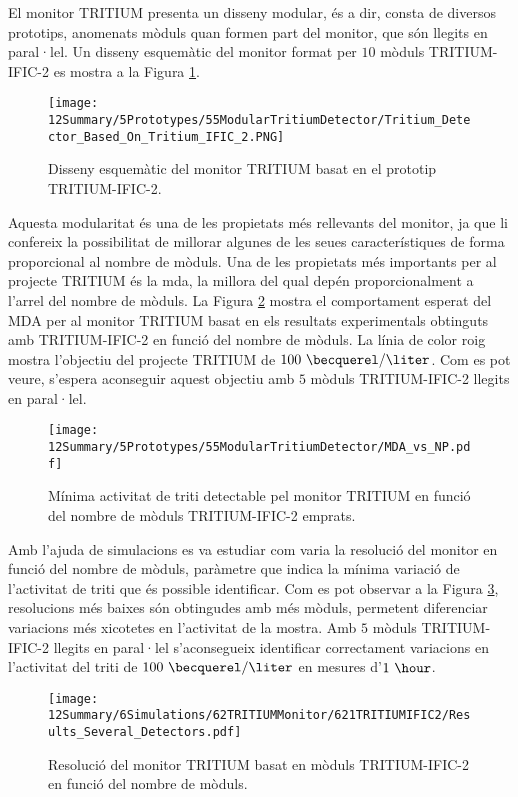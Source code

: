 El monitor TRITIUM presenta un disseny modular, és a dir, consta de diversos prototips, anomenats mòduls quan formen part del monitor, que són llegits en paral·lel. Un disseny esquemàtic del monitor format per $10$ mòduls TRITIUM-IFIC-2 es mostra a la Figura \ref{fig:10TritiumMonitorIFIC2}.
\begin{figure}[h]
\centering
\texttt{[image: 12Summary/5Prototypes/55ModularTritiumDetector/Tritium\_Detector\_Based\_On\_Tritium\_IFIC\_2.PNG]}
\caption{Disseny esquemàtic del monitor TRITIUM basat en el prototip TRITIUM-IFIC-2.\label{fig:10TritiumMonitorIFIC2}}
\end{figure}
Aquesta modularitat és una de les propietats més rellevants del monitor, ja que li confereix la possibilitat de millorar algunes de les seues característiques de forma proporcional al nombre de mòduls. Una de les propietats més importants per al projecte TRITIUM és la mda, la millora del qual depén proporcionalment a l'arrel del nombre de mòduls. La Figura \ref{fig:MDATritiumMonitorIFIC2} mostra el comportament esperat del MDA per al monitor TRITIUM basat en els resultats experimentals obtinguts amb TRITIUM-IFIC-2 en funció del nombre de mòduls. La línia de color roig mostra l'objectiu del projecte TRITIUM de $100~\becquerel/\liter$. Com es pot veure, s'espera aconseguir aquest objectiu amb $5$ mòduls TRITIUM-IFIC-2 llegits en paral·lel.

\begin{figure}[h]
\centering
\texttt{[image: 12Summary/5Prototypes/55ModularTritiumDetector/MDA\_vs\_NP.pdf]}
\caption{Mínima activitat de triti detectable pel monitor TRITIUM en funció del nombre de mòduls TRITIUM-IFIC-2 emprats.\label{fig:MDATritiumMonitorIFIC2}}
\end{figure}

Amb l'ajuda de simulacions es va estudiar com varia la resolució del monitor en funció del nombre de mòduls, paràmetre que indica la mínima variació de l'activitat de triti que és possible identificar. Com es pot observar a la Figura \ref{fig:ResolucioTritiumMonitorIFIC2}, resolucions més baixes són obtingudes amb més mòduls, permetent diferenciar variacions més xicotetes en l'activitat de la mostra. Amb $5$ mòduls TRITIUM-IFIC-2 llegits en paral·lel s'aconsegueix identificar correctament variacions en l'activitat del triti de $100~\becquerel/\liter$ en mesures d'$1~\hour$.

\begin{figure}[h]
\centering
\texttt{[image: 12Summary/6Simulations/62TRITIUMMonitor/621TRITIUMIFIC2/Results\_Several\_Detectors.pdf]}
\caption{Resolució del monitor TRITIUM basat en mòduls TRITIUM-IFIC-2 en funció del nombre de mòduls.\label{fig:ResolucioTritiumMonitorIFIC2}}
\end{figure}